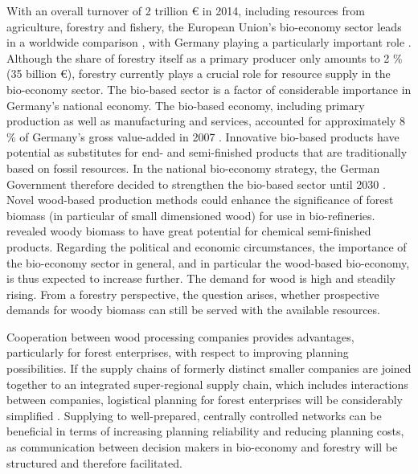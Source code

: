 With an overall turnover of 2 trillion {\euro} in 2014, including resources from agriculture, forestry and fishery, the European Union's bio-economy sector leads in a worldwide comparison \citep[p. 221, 223]{elchichakli_2016}, with Germany playing a particularly important role \citep[p. 200]{hennig_2016}. Although the share of forestry itself as a primary producer only amounts to 2 \% (35 billion {\euro}), forestry currently plays a crucial role for resource supply in the bio-economy sector. The bio-based sector is a factor of considerable importance in Germany's national economy. The bio-based economy, including primary production as well as manufacturing and services, accounted for approximately 8 \% of Germany's gross value-added in 2007 \citep[p. 29-30]{efken_2012}. Innovative bio-based products have potential as substitutes for end- and semi-finished products that are traditionally based on fossil resources. In the national bio-economy strategy, the German Government therefore decided to strengthen the bio-based sector until 2030 \citep[p. 15-16]{bmel_2014b}. Novel wood-based production methods could enhance the significance of forest biomass (in particular of small dimensioned wood) for use in bio-refineries. \citet[p. 49]{ekman_2013} revealed woody biomass to have great potential for chemical semi-finished products. Regarding the political and economic circumstances, the importance of the bio-economy sector in general, and in particular the wood-based bio-economy, is thus expected to increase further. The demand for wood is high and steadily rising. From a forestry perspective, the question arises, whether prospective demands for woody biomass can still be served with the available resources.

Cooperation between wood processing companies provides advantages, particularly for forest enterprises, with respect to improving planning possibilities. If the supply chains of formerly distinct smaller companies are joined together to an integrated super-regional supply chain, which includes interactions between companies, logistical planning for forest enterprises will be considerably simplified \citep[p. 3]{geldermann_2016}. Supplying to well-prepared, centrally controlled networks can be beneficial in terms of increasing planning reliability and reducing planning costs, as communication between decision makers in bio-economy and forestry will be structured and therefore facilitated.

